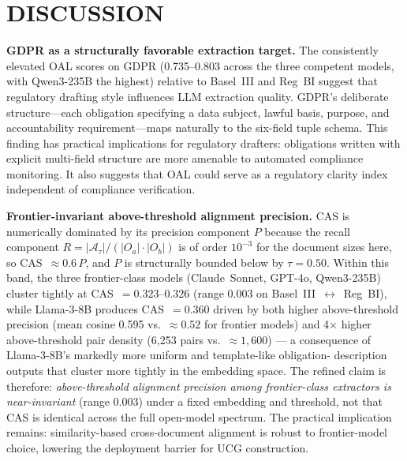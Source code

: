 \documentclass{article}
\begin{document}
\section{DISCUSSION}
\label{sec:discussion_section}

\textbf{GDPR as a structurally favorable extraction target.}
The consistently elevated OAL scores on GDPR (0.735--0.803 across
the three competent models, with Qwen3-235B the highest) relative
to Basel~III and Reg~BI suggest that regulatory drafting style
influences LLM extraction quality.
GDPR's deliberate structure---each obligation specifying a data
subject, lawful basis, purpose, and accountability requirement---maps
naturally to the six-field tuple schema.
This finding has practical implications for regulatory drafters:
obligations written with explicit multi-field structure are more
amenable to automated compliance monitoring.
It also suggests that OAL could serve as a regulatory clarity index
independent of compliance verification.

\textbf{Frontier-invariant above-threshold alignment precision.}
CAS is numerically dominated by its precision component $P$ because
the recall component $R = |\mathcal{A}_\tau| / (|O_a|\cdot|O_b|)$ is of
order $10^{-3}$ for the document sizes here, so
CAS~$\approx 0.6\,P$, and $P$ is structurally bounded below by
$\tau = 0.50$. Within this band, the three frontier-class models
(Claude~Sonnet, GPT-4o, Qwen3-235B) cluster tightly at
CAS~$=0.323$--$0.326$ (range 0.003 on Basel~III~$\leftrightarrow$~Reg~BI),
while Llama-3-8B produces CAS~$=0.360$ driven by both higher
above-threshold precision (mean cosine 0.595 vs.\ $\approx 0.52$ for
frontier models) and 4$\times$ higher above-threshold pair density
(6{,}253 pairs vs.\ $\approx 1{,}600$) --- a consequence of
Llama-3-8B's markedly more uniform and template-like obligation-
description outputs that cluster more tightly in the embedding space.
The refined claim is therefore: \emph{above-threshold alignment
precision among frontier-class extractors is near-invariant} (range
0.003) under a fixed embedding and threshold, not that CAS is
identical across the full open-model spectrum. The practical
implication remains: similarity-based cross-document alignment is
robust to frontier-model choice, lowering the deployment barrier for
UCG construction.
\end{document}
